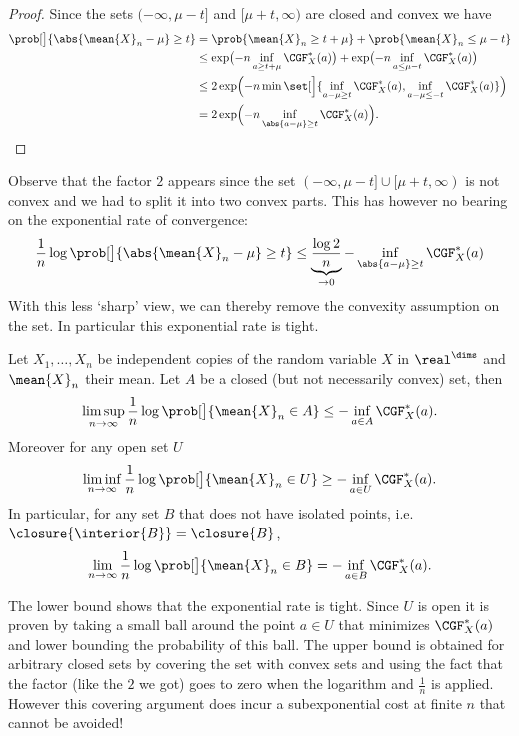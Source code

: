 \begin{proof}
    Since the sets \((-\infty, \mu - t]\) and \([\mu + t, \infty)\) are closed
    and convex we have
    \[\begin{aligned}[b]
        \prob[\big]{\abs{\mean{X}_n - \mu} \ge t}
        &= \prob{\mean{X}_n \ge t + \mu} + \prob{\mean{X}_n \le \mu - t}
        \\
        &\le \exp\bigl(-n \inf_{a \ge t+\mu}\CGF_X^*(a)\bigr) + \exp\bigl(-n \inf_{a \le \mu - t}\CGF_{X}^*(a)\bigr)
        \\
        &\le 2 \exp\Bigl(-n \min\set[\Big]{\inf_{a-\mu \ge t}\CGF_X^*(a), \inf_{a-\mu \le -t}\CGF_X^*(a)}\Bigr)
        \\
        &= 2 \exp\Bigl(-n \inf_{\abs{a-\mu}\ge t} \CGF_X^*(a)\Bigr).
    \end{aligned}
    \qedhere
    \]
\end{proof}

Observe that the factor \(2\) appears since the set \((-\infty, \mu - t]
\cup [\mu + t, \infty)\) is not convex and we had to split it into two convex
parts. This has however no bearing on the exponential rate of convergence:
\[
    \frac1n \log \prob[\big]{\abs{\mean{X}_n - \mu} \ge t}
    \le \underbrace{\frac{\log{2}}n}_{\to 0} - \inf_{\abs{a-\mu}\ge t} \CGF_X^*(a)
\]
With this less `sharp' view, we can thereby remove the convexity assumption on the set.
In particular this exponential rate is tight.

\begin{mdframed}[innertopmargin=0pt]
\begin{fact}[Cramér]
    Let \(X_1, \ldots, X_n\) be independent copies of the random variable \(X\) 
    in \(\real^\dims\) and \(\mean{X}_n\) their mean. Let \(A\) be a closed (but
    not necessarily convex) set, then
    \[
        \limsup_{n\to\infty} \frac1n \log \prob[\big]{\mean{X}_n \in A} \le -\inf_{a\in A} \CGF_X^*(a).
    \]
    Moreover for any open set \(U\)
    \[
        \liminf_{n\to\infty} \frac1n \log \prob[\big]{\mean{X}_n \in U} \ge -\inf_{a\in U} \CGF_X^*(a).
    \]
    In particular, for any set \(B\) that does not have isolated points, i.e.~\(\closure{\interior{B}} = \closure{B}\),
    \[
        \lim_{n\to\infty} \frac1n \log \prob[\big]{\mean{X}_n \in B} = -\inf_{a\in B} \CGF_X^*(a).
    \]
\end{fact}
\end{mdframed}

The lower bound shows that the exponential rate is tight. Since \(U\)
is open it is proven by taking a small ball around the point \(a\in U\) that minimizes \(\CGF_X^*(a)\) and
lower bounding the probability of this ball.
The upper bound is obtained for
arbitrary closed sets by covering the set with convex sets and using the fact
that the factor (like the \(2\) we got) goes to zero when the logarithm and
\(\frac1n\) is applied.
However this covering argument does incur a subexponential cost at finite \(n\) that cannot be
avoided! 

